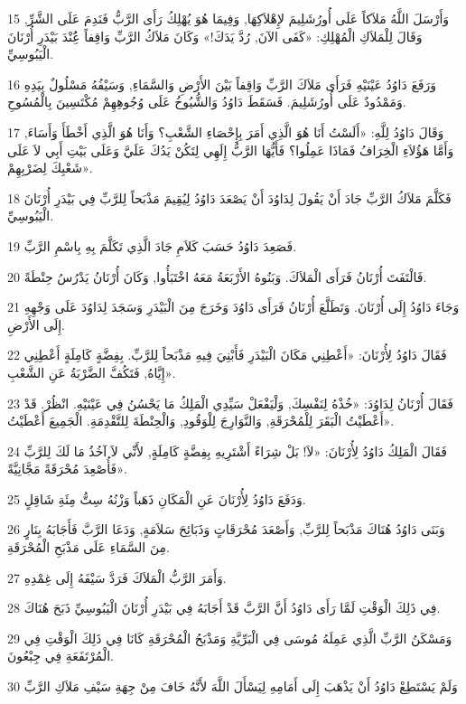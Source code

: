 \par 15 وَأَرْسَلَ اللَّهُ مَلاَكاً عَلَى أُورُشَلِيمَ لإِهْلاَكِهَا, وَفِيمَا هُوَ يُهْلِكُ رَأَى الرَّبُّ فَنَدِمَ عَلَى الشَّرِّ, وَقَالَ لِلْمَلاَكِ الْمُهْلِكِ: «كَفَى الآنَ, رُدَّ يَدَكَ!» وَكَانَ مَلاَكُ الرَّبِّ وَاقِفاً عَُِنْدَ بَيْدَرِ أُرْنَانَ الْيَبُوسِيِّ.
\par 16 وَرَفَعَ دَاوُدُ عَيْنَيْهِ فَرَأَى مَلاَكَ الرَّبِّ وَاقِفاً بَيْنَ الأَرْضِ وَالسَّمَاءِ, وَسَيْفُهُ مَسْلُولٌ بِيَدِهِ وَمَمْدُودٌ عَلَى أُورُشَلِيمَ. فَسَقَطَ دَاوُدُ وَالشُّيُوخُ عَلَى وُجُوهِهِمْ مُكْتَسِينَ بِالْمُسُوحِ.
\par 17 وَقَالَ دَاوُدُ لِلَّهِ: «أَلَسْتُ أَنَا هُوَ الَّذِي أَمَرَ بِإِحْصَاءِ الشَّعْبِ؟ وَأَنَا هُوَ الَّذِي أَخْطَأَ وَأَسَاءَ, وَأَمَّا هَؤُلاَءِ الْخِرَافُ فَمَاذَا عَمِلُوا؟ فَأَيُّهَا الرَّبُّ إِلَهِي لِتَكُنْ يَدُكَ عَلَيَّ وَعَلَى بَيْتِ أَبِي لاَ عَلَى شَعْبِكَ لِضَرْبِهِمْ».
\par 18 فَكَلَّمَ مَلاَكُ الرَّبِّ جَادَ أَنْ يَقُولَ لِدَاوُدَ أَنْ يَصْعَدَ دَاوُدُ لِيُقِيمَ مَذْبَحاً لِلرَّبِّ فِي بَيْدَرِ أُرْنَانَ الْيَبُوسِيِّ.
\par 19 فَصَعِدَ دَاوُدُ حَسَبَ كَلاَمِ جَادَ الَّذِي تَكَلَّمَ بِهِ بِاسْمِ الرَّبِّ.
\par 20 فَالْتَفَتَ أُرْنَانُ فَرَأَى الْمَلاَكَ. وَبَنُوهُ الأَرْبَعَةُ مَعَهُ اخْتَبَأُوا, وَكَانَ أُرْنَانُ يَدْرُسُ حِنْطَةً.
\par 21 وَجَاءَ دَاوُدُ إِلَى أُرْنَانَ. وَتَطَلَّعَ أُرْنَانُ فَرَأَى دَاوُدَ وَخَرَجَ مِنَ الْبَيْدَرِ وَسَجَدَ لِدَاوُدَ عَلَى وَجْهِهِ إِلَى الأَرْضِ.
\par 22 فَقَالَ دَاوُدُ لِأُرْنَانَ: «أَعْطِنِي مَكَانَ الْبَيْدَرِ فَأَبْنِيَ فِيهِ مَذْبَحاً لِلرَّبِّ. بِفِضَّةٍ كَامِلَةٍ أَعْطِنِي إِيَّاهُ, فَتَكُفَّ الضَّرْبَةُ عَنِ الشَّعْبِ».
\par 23 فَقَالَ أُرْنَانُ لِدَاوُدَ: «خُذْهُ لِنَفْسِكَ, وَلْيَفْعَلْ سَيِّدِي الْمَلِكُ مَا يَحْسُنُ فِي عَيْنَيْهِ. انْظُرْ. قَدْ أَعْطَيْتُ الْبَقَرَ لِلْمُحْرَقَةِ, وَالنَّوَارِجَ لِلْوَقُودِ, وَالْحِنْطَةَ لِلتَّقْدِمَةِ. الْجَمِيعَ أَعْطَيْتُ».
\par 24 فَقَالَ الْمَلِكُ دَاوُدُ لِأُرْنَانَ: «لاَ! بَلْ شِرَاءً أَشْتَرِيهِ بِفِضَّةٍ كَامِلَةٍ, لأَنِّي لاَ آخُذُ مَا لَكَ لِلرَّبِّ فَأُصْعِدَ مُحْرَقَةً مَجَّانِيَّةً».
\par 25 وَدَفَعَ دَاوُدُ لِأُرْنَانَ عَنِ الْمَكَانِ ذَهَباً وَزْنُهُ سِتُّ مِئَةِ شَاقِلٍ.
\par 26 وَبَنَى دَاوُدُ هُنَاكَ مَذْبَحاً لِلرَّبِّ, وَأَصْعَدَ مُحْرَقَاتٍ وَذَبَائِحَ سَلاَمَةٍ, وَدَعَا الرَّبَّ فَأَجَابَهُ بِنَارٍ مِنَ السَّمَاءِ عَلَى مَذْبَحِ الْمُحْرَقَةِ.
\par 27 وَأَمَرَ الرَّبُّ الْمَلاَكَ فَرَدَّ سَيْفَهُ إِلَى غِمْدِهِ.
\par 28 فِي ذَلِكَ الْوَقْتِ لَمَّا رَأَى دَاوُدُ أَنَّ الرَّبَّ قَدْ أَجَابَهُ فِي بَيْدَرِ أُرْنَانَ الْيَبُوسِيِّ ذَبَحَ هُنَاكَ.
\par 29 وَمَسْكَنُ الرَّبِّ الَّذِي عَمِلَهُ مُوسَى فِي الْبَرِّيَّةِ وَمَذْبَحُ الْمُحْرَقَةِ كَانَا فِي ذَلِكَ الْوَقْتِ فِي الْمُرْتَفَعَةِ فِي جِبْعُونَ.
\par 30 وَلَمْ يَسْتَطِعْ دَاوُدُ أَنْ يَذْهَبَ إِلَى أَمَامِهِ لِيَسْأَلَ اللَّهَ لأَنَّهُ خَافَ مِنْ جِهَةِ سَيْفِ مَلاَكِ الرَّبِّ

